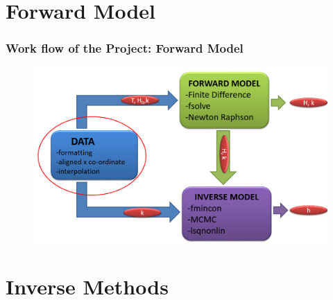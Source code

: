 \documentclass[7pt]{beamer}
\begin{document}
\section{Forward Model}

\begin{frame}
 	\frametitle{Work flow of the Project: Forward Model}
		\begin{figure}[H]
	 		\centering
	 		\includegraphics[width=1.0\linewidth]{img/Focus_D.png}
	 	\end{figure}
\end{frame}

\section{Inverse Methods}
\end{document}
